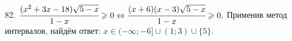 82. $\cfrac{(x^2+3x-18)\sqrt{5-x}}{1-x}\geqslant0\Leftrightarrow\cfrac{(x+6)(x-3)\sqrt{5-x}}{1-x}\geqslant0.$ Применив метод интервалов, найдём ответ: $x\in(-\infty;-6]\cup(1;3)\cup\{5\}.$
\begin{figure}[ht!]
\end{figure}\\

